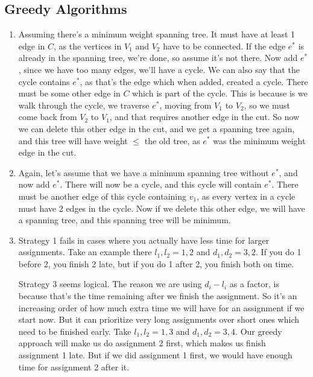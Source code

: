 \documentclass[12pt]{report}
\begin{document}
\subsection*{\Large\bfseries Greedy Algorithms}
\begin{enumerate}[label=\textbf{\arabic*.}]

  \item Assuming there's a minimum weight spanning tree. It must have at least 1 edge in $C$, as the vertices in $V_1$ and $V_2$ have to be connected.
  If the edge $e^*$ is already in the spanning tree, we're done, so assume it's not there. Now add $e^*$, since we have too many edges, we'll have a cycle.
  We can also say that the cycle contains $e^*$, as that's the edge which when added, created a cycle. There must be some other edge in $C$ which is part of 
  the cycle. This is because is we walk through the cycle, we traverse $e^*$, moving from $V_1$ to $V_2$, so we must come back from $V_2$ to $V_1$, and that
  requires another edge in the cut. So now we can delete this other edge in the cut, and we get a spanning tree again, and this tree will have weight $\leq$
  the old tree, as $e^*$ was the minimum weight edge in the cut.

  \item Again, let's assume that we have a minimum spanning tree without $e^*$, and now add $e^*$. There will now be a cycle, and this cycle will contain 
  $e^*$. There must be another edge of this cycle containing $v_1$, as every vertex in a cycle must have 2 edges in the cycle. Now if we delete this other 
  edge, we will have a spanning tree, and this spanning tree will be minimum.

  \item Strategy 1 fails in cases where you actually have less time for larger assignments. Take an example there $l_1, l_2 = 1, 2$ and $d_1, d_2 = 3, 2$. If 
  you do 1 before 2, you finish 2 late, but if you do 1 after 2, you finish both on time.

  Strategy 3 seems logical. The reason we are using $d_i - l_i$ as a factor, is because that's the time remaining after we finish the assignment. So it's an 
  increasing order of how much extra time we will have for an assignment if we start now. But it can prioritize very long assignments over short ones which 
  need to be finished early. Take $l_1, l_2 = 1, 3$ and $d_1, d_2 = 3, 4$. Our greedy approach will make us do assignment 2 first, which makes us finish
  assignment 1 late. But if we did assignment 1 first, we would have enough time for assignment 2 after it.


\end{enumerate}
\end{document}

